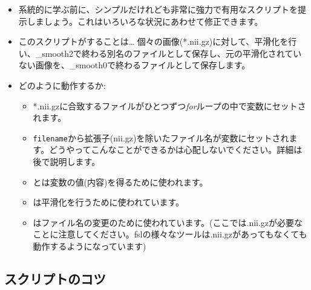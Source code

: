 \documentclass{jsarticle}
\begin{document}
\begin{itemize}
\item 系統的に学ぶ前に、シンプルだけれども非常に強力で有用なスクリプトを提示しましょう。これはいろいろな状況にあわせて修正できます。

\bigskip

{}

\bigskip

\item このスクリプトがすることは… 個々の画像(*.nii.gz)に対して、平滑化を行い、\_smooth2で終わる別名のファイルとして保存し、元の平滑化されていない画像を、\_smooth0で終わるファイルとして保存します。

\item どのように動作するか:

	\begin{itemize}
	\item *.nii.gzに合致するファイルがひとつずつ{\em for}ループの中で変数{\color{red}}にセットされます。

	\item {\tt filename}から拡張子(nii.gz)を除いたファイル名が変数{\color{red}}にセットされます。どうやってこんなことができるかは心配しないでください。詳細は後で説明します。

	\item {\color{red}}と{\color{red}}は変数の値(内容)を得るために使われます。
	\item {\color{red}}は平滑化を行うために使われています。
	\item {\color{red}}はファイル名の変更のために使われています。(ここでは.nii.gzが必要なことに注意してください。fslの様々なツールは.nii.gzがあってもなくても動作するようになっています)
	\end{itemize}
\end{itemize}


\subsection{スクリプトのコツ}
\end{document}

